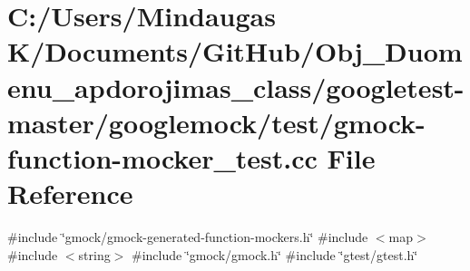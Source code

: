 \hypertarget{googletest-master_2googlemock_2test_2gmock-function-mocker__test_8cc}{}\section{C\+:/\+Users/\+Mindaugas K/\+Documents/\+Git\+Hub/\+Obj\+\_\+\+Duomenu\+\_\+apdorojimas\+\_\+class/googletest-\/master/googlemock/test/gmock-\/function-\/mocker\+\_\+test.cc File Reference}
\label{googletest-master_2googlemock_2test_2gmock-function-mocker__test_8cc}
{\ttfamily \#include \char`\"{}gmock/gmock-\/generated-\/function-\/mockers.\+h\char`\"{}}\newline
{\ttfamily \#include $<$map$>$}\newline
{\ttfamily \#include $<$string$>$}\newline
{\ttfamily \#include \char`\"{}gmock/gmock.\+h\char`\"{}}\newline
{\ttfamily \#include \char`\"{}gtest/gtest.\+h\char`\"{}}\newline
